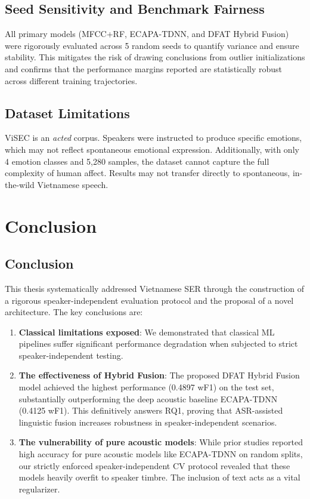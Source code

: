 \documentclass[12pt,a4paper]{report}
\begin{document}
\section{Seed Sensitivity and Benchmark Fairness}
All primary models (MFCC+RF, ECAPA-TDNN, and DFAT Hybrid Fusion) were rigorously evaluated across 5 random seeds to quantify variance and ensure stability. This mitigates the risk of drawing conclusions from outlier initializations and confirms that the performance margins reported are statistically robust across different training trajectories.

\section{Dataset Limitations}
ViSEC is an \textit{acted} corpus. Speakers were instructed to produce specific emotions, which may not reflect spontaneous emotional expression. Additionally, with only 4 emotion classes and 5,280 samples, the dataset cannot capture the full complexity of human affect. Results may not transfer directly to spontaneous, in-the-wild Vietnamese speech.

\chapter{Conclusion}
\section{Conclusion}
This thesis systematically addressed Vietnamese SER through the construction of a rigorous speaker-independent evaluation protocol and the proposal of a novel architecture. The key conclusions are:
\begin{enumerate}
    \item \textbf{Classical limitations exposed}: We demonstrated that classical ML pipelines suffer significant performance degradation when subjected to strict speaker-independent testing.
    \item \textbf{The effectiveness of Hybrid Fusion}: The proposed DFAT Hybrid Fusion model achieved the highest performance (0.4897 wF1) on the test set, substantially outperforming the deep acoustic baseline ECAPA-TDNN (0.4125 wF1). This definitively answers RQ1, proving that ASR-assisted linguistic fusion increases robustness in speaker-independent scenarios.
    \item \textbf{The vulnerability of pure acoustic models}: While prior studies reported high accuracy for pure acoustic models like ECAPA-TDNN on random splits, our strictly enforced speaker-independent CV protocol revealed that these models heavily overfit to speaker timbre. The inclusion of text acts as a vital regularizer.
\end{enumerate}
\end{document}
